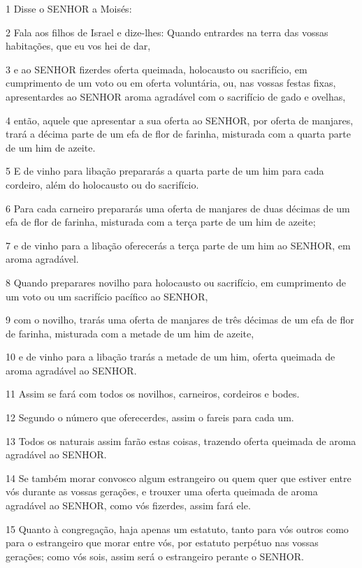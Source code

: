 \par 1 Disse o SENHOR a Moisés:
\par 2 Fala aos filhos de Israel e dize-lhes: Quando entrardes na terra das vossas habitações, que eu vos hei de dar,
\par 3 e ao SENHOR fizerdes oferta queimada, holocausto ou sacrifício, em cumprimento de um voto ou em oferta voluntária, ou, nas vossas festas fixas, apresentardes ao SENHOR aroma agradável com o sacrifício de gado e ovelhas,
\par 4 então, aquele que apresentar a sua oferta ao SENHOR, por oferta de manjares, trará a décima parte de um efa de flor de farinha, misturada com a quarta parte de um him de azeite.
\par 5 E de vinho para libação prepararás a quarta parte de um him para cada cordeiro, além do holocausto ou do sacrifício.
\par 6 Para cada carneiro prepararás uma oferta de manjares de duas décimas de um efa de flor de farinha, misturada com a terça parte de um him de azeite;
\par 7 e de vinho para a libação oferecerás a terça parte de um him ao SENHOR, em aroma agradável.
\par 8 Quando preparares novilho para holocausto ou sacrifício, em cumprimento de um voto ou um sacrifício pacífico ao SENHOR,
\par 9 com o novilho, trarás uma oferta de manjares de três décimas de um efa de flor de farinha, misturada com a metade de um him de azeite,
\par 10 e de vinho para a libação trarás a metade de um him, oferta queimada de aroma agradável ao SENHOR.
\par 11 Assim se fará com todos os novilhos, carneiros, cordeiros e bodes.
\par 12 Segundo o número que oferecerdes, assim o fareis para cada um.
\par 13 Todos os naturais assim farão estas coisas, trazendo oferta queimada de aroma agradável ao SENHOR.
\par 14 Se também morar convosco algum estrangeiro ou quem quer que estiver entre vós durante as vossas gerações, e trouxer uma oferta queimada de aroma agradável ao SENHOR, como vós fizerdes, assim fará ele.
\par 15 Quanto à congregação, haja apenas um estatuto, tanto para vós outros como para o estrangeiro que morar entre vós, por estatuto perpétuo nas vossas gerações; como vós sois, assim será o estrangeiro perante o SENHOR.
